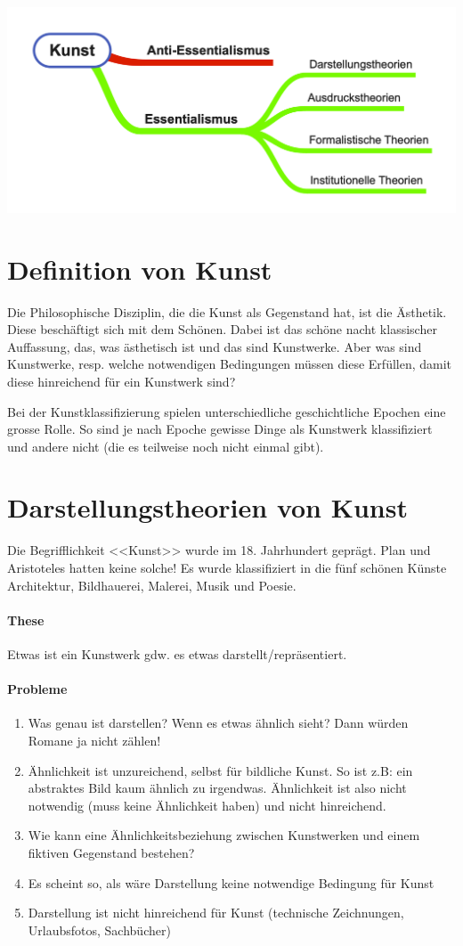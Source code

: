 \documentclass[../main.tex]{subfiles}
\begin{document}
\includegraphics[width=\textwidth]{images/Kunst_Uebersicht.png}

\section{Definition von Kunst}
Die Philosophische Disziplin, die die Kunst als Gegenstand hat, ist die Ästhetik. Diese beschäftigt sich mit dem Schönen. Dabei ist das schöne nacht klassischer Auffassung, das, was ästhetisch ist und das sind Kunstwerke. Aber was sind Kunstwerke, resp. welche notwendigen Bedingungen müssen diese Erfüllen, damit diese hinreichend für ein Kunstwerk sind?

Bei der Kunstklassifizierung spielen unterschiedliche geschichtliche Epochen eine grosse Rolle. So sind je nach Epoche gewisse Dinge als Kunstwerk klassifiziert und andere nicht (die es teilweise noch nicht einmal gibt). 

\section{Darstellungstheorien von Kunst}
Die Begrifflichkeit <<Kunst>> wurde im 18. Jahrhundert geprägt. Plan und Aristoteles hatten keine solche! Es wurde klassifiziert in die fünf schönen Künste Architektur, Bildhauerei, Malerei, Musik und Poesie. 

\paragraph{These} Etwas ist ein Kunstwerk gdw. es etwas darstellt/repräsentiert.
\paragraph{Probleme} 
\begin{enumerate}
	\item Was genau ist darstellen? Wenn es etwas ähnlich sieht? Dann würden Romane ja nicht zählen!
	\item Ähnlichkeit ist unzureichend, selbst für bildliche Kunst. So ist z.B: ein abstraktes Bild kaum ähnlich zu irgendwas. Ähnlichkeit ist also nicht notwendig (muss keine Ähnlichkeit haben) und nicht hinreichend.
	\item Wie kann eine Ähnlichkeitsbeziehung zwischen Kunstwerken und einem fiktiven Gegenstand bestehen?
	\item Es scheint so, als wäre Darstellung keine notwendige Bedingung für Kunst
	\item Darstellung ist nicht hinreichend für Kunst (technische Zeichnungen, Urlaubsfotos, Sachbücher)
\end{enumerate}
\end{document}
